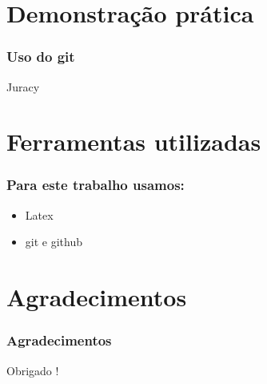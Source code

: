 \documentclass{beamer}
\begin{document}
  \section{Demonstração prática}
  \begin{frame}
    \frametitle{Uso do git}
    \vfill
      \begin{flushright}
        Juracy
    \end{flushright}
  \end{frame}

  \section{Ferramentas utilizadas}
  \begin{frame}
    \frametitle{Para este trabalho usamos:}
    \begin{itemize}
      \item Latex
      \item git e github
    \end{itemize}
  \end{frame}
  
    \section{Agradecimentos}
    \begin{frame}
        \frametitle{Agradecimentos}
        \begin{center}
            Obrigado !
        \end{center}
    \end{frame}
\end{document}
